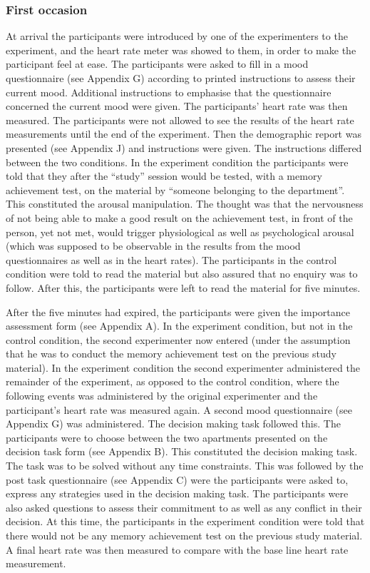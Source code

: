 \subsubsection{First occasion}

At arrival the participants were introduced  by one of the
experimenters to the experiment, and the heart rate meter was showed
to them, in order to make the participant feel at ease.  The
participants were asked to fill in a mood questionnaire (see Appendix
G) according to printed instructions to assess their current mood.
Additional instructions to emphasise that the questionnaire concerned
the current mood were given.  The participants' heart rate was then
measured.  The participants were not allowed to see the results of the
heart rate measurements until the end of the experiment.  Then the
demographic report was presented (see Appendix J) and instructions
were given.  The instructions differed between the two conditions.  In
the experiment condition the participants were told that they after
the ``study'' session would be tested, with a memory achievement test,
on the material by ``someone belonging to the department''.  This
constituted the arousal manipulation.  The thought was that the
nervousness of not being able to make a good result on the achievement
test, in front of the person, yet not met, would trigger physiological
as well as psychological arousal (which was supposed to be observable
in the results from the mood questionnaires as well as in the heart
rates).  The participants in the control condition were told to read
the material but also assured that no enquiry was to follow.  After
this, the participants were left to read the material for five
minutes.

After the five minutes had expired, the participants were given the
importance assessment form (see Appendix A).  In the experiment
condition, but not in the control condition, the second experimenter
now entered (under the assumption that he was to conduct the memory
achievement test on the previous study material).  In the experiment
condition the second experimenter administered the remainder of  the
experiment,  as opposed to the control condition, where the following
events was administered by the original experimenter and the
participant's heart rate was measured again.  A second mood
questionnaire (see Appendix G) was administered.  The decision making
task followed this.  The participants were to choose between the two
apartments presented on the decision task form (see Appendix B).  This
constituted the decision making task.  The task was to be solved
without any time constraints.  This was followed by the post task
questionnaire (see Appendix C) were the participants were asked to,
express any strategies used in the decision making task.  The
participants were also asked questions to assess their commitment to
as well as any conflict in their decision.  At this time, the
participants in the experiment condition were told that there would
not be any  memory achievement test on the previous study material.  A
final heart rate was then measured to compare with the base line heart
rate measurement.

